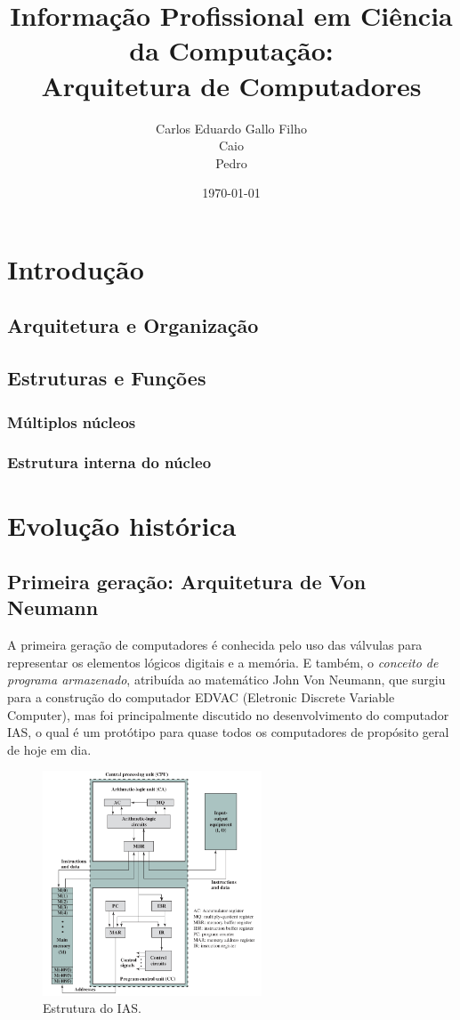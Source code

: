 \documentclass{article}
\title{Informação Profissional em Ciência da Computação:\\
	Arquitetura de Computadores}
\author{Carlos Eduardo Gallo Filho \\
	Caio \\
	Pedro}
\date{\today}
\begin{document}
\maketitle

\section{Introdução}
\subsection{Arquitetura e Organização}
\subsection{Estruturas e Funções}
\subsubsection{Múltiplos núcleos}
\subsubsection{Estrutura interna do núcleo}

\section{Evolução histórica}
\subsection{Primeira geração: Arquitetura de Von Neumann}
A primeira geração de computadores é conhecida pelo uso das válvulas para
representar os elementos lógicos digitais e a memória. E também, o
\textit{conceito de programa armazenado}, atribuída ao matemático John Von
Neumann, que surgiu para a construção do computador EDVAC (Eletronic Discrete
Variable Computer), mas foi principalmente discutido no desenvolvimento do
computador IAS, o qual é um protótipo para quase todos os computadores de
propósito geral de hoje em dia.

\begin{figure}[h]
    \caption{Estrutura do IAS.}
    \centering
    \includegraphics[width=0.58\textwidth]{ias.png}
\end{figure}
\end{document}
